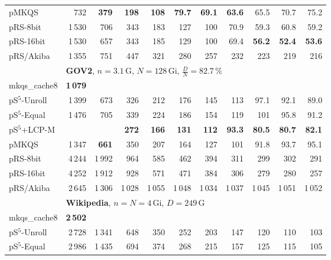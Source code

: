 \documentclass[a4paper]{myjournal}
\begin{document}
\begin{table}
\begin{tabular}{l|*{10}{r}|@{}}
        pMKQS &    732 & \bf 379 & \bf 198 & \bf 108 & \bf 79.7 & \bf 69.1 & \bf 63.6 &     65.5 &     70.7 &     75.2 \\
     pRS-8bit & 1\,530 &     706 &     343 &     183 &      127 &      100 &     70.9 &     59.3 &     60.8 &     59.2 \\
    pRS-16bit & 1\,530 &     657 &     343 &     185 &      129 &      100 &     69.4 & \bf 56.2 & \bf 52.4 & \bf 53.6 \\
    pRS/Akiba & 1\,355 &     751 &     447 &     321 &      280 &      257 &      232 &      223 &      219 &      216 \\ \hline
& \multicolumn{10}{l|}{\textbf{GOV2}, $n = 3.1\,\text{G}$, $N = 128\,\text{Gi}$, $\frac{D}{N} = 82.7\,\%$} \\ \cline{2-11}
mkqs\_cache8 & \bf 1\,079 &  &  &  &  &  &  &  &  &  \\
pS$^5$-Unroll & 1\,399 &     673 &     326 &     212 &     176 &     145 &      113 &     97.1 &     92.1 &     89.0 \\
 pS$^5$-Equal & 1\,476 &     705 &     339 &     224 &     186 &     154 &      119 &      101 &     95.8 &     91.2 \\
 pS$^5$+LCP-M &        &         & \bf 272 & \bf 166 & \bf 131 & \bf 112 & \bf 93.3 & \bf 80.5 & \bf 80.7 & \bf 82.1 \\
        pMKQS & 1\,347 & \bf 661 &     350 &     207 &     164 &     127 &      101 &     91.8 &     93.7 &     95.1 \\
     pRS-8bit & 4\,244 &  1\,992 &     964 &     585 &     462 &     394 &      311 &      299 &      302 &      291 \\
    pRS-16bit & 4\,252 &  1\,912 &     928 &     571 &     471 &     384 &      306 &      279 &      280 &      257 \\
    pRS/Akiba & 2\,645 &  1\,306 &  1\,028 &  1\,055 &  1\,048 &  1\,034 &   1\,037 &   1\,045 &   1\,051 &   1\,052 \\ \hline
& \multicolumn{10}{l|}{\textbf{Wikipedia}, $n = N = 4\,\text{Gi}$, $D = 249\,\text{G}$} \\ \cline{2-11}
mkqs\_cache8 & \bf 2\,502 &  &  &  &  &  &  &  &  &  \\
pS$^5$-Unroll & 2\,728 &     1\,341 &     648 &     350 &     252 &     203 &     147 &     120 &      110 &      103 \\
 pS$^5$-Equal & 2\,986 &     1\,435 &     694 &     374 &     268 &     215 &     157 &     125 &      115 &      105 \\

\end{tabular}
\end{table}
\end{document}
